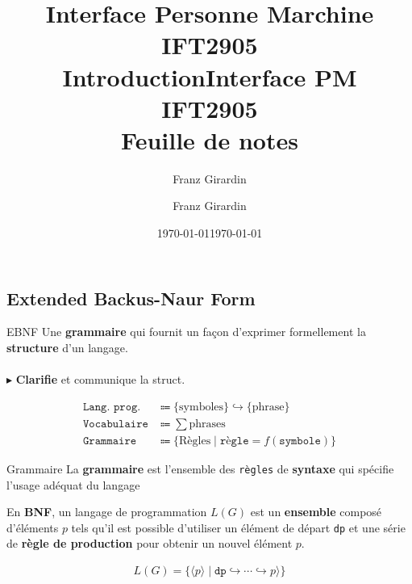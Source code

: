 \documentclass{report}
\title{\Huge{Interface Personne Marchine}\\{IFT2905}\\{\textbf{Introduction}}}
\author{\huge{Franz Girardin}}
\date{\today}
\title{\Huge{Interface PM}\\{IFT2905}\\{\textbf{Feuille de notes}}}
\author{\huge{Franz Girardin}}
\date{\today}
\begin{document}
\maketitle
\pagebreak
\tableofcontents
\pagebreak


\begin{multicols*}{3}


    \footnotesize

    \chapter{Extended Backus-Naur Form}

\begin{Definitionx}{EBNF}{}
  Une \textbf{grammaire} qui fournit un façon d'exprimer formellement 
  la \textbf{structure} d'un langage. 
  \mbox{}
  \\ \\ 
  $\blacktriangleright$  \textbf{ Clarifie} et communique la struct. 
\end{Definitionx}


\begin{align*}
  \texttt{Lang. prog. } & \Coloneqq \bigl\{\text{symboles} \bigr\}   
  \hookrightarrow \bigl\{ \text{phrase} \bigr\} 
  \\
  \texttt{Vocabulaire} & \Coloneqq \sum \text{phrases}
  \\
  \texttt{Grammaire} & \Coloneqq \bigl\{ \text{Règles} \; \big| \;
              \texttt{règle} = f(\texttt{symbole})  \bigr\}
\end{align*}      

\begin{Definitionx}{Grammaire}{}
    La \textbf{grammaire} est l'ensemble des \texttt{règles} 
    de \textbf{syntaxe} qui spécifie l'usage adéquat du langage   
\end{Definitionx}

En \textbf{BNF},   un langage de programmation $L(G)$ est un 
\textbf{ensemble} composé d'éléments $p$ tels 
qu'il est possible d'utiliser un élément de départ 
\texttt{dp} et une série de \textbf{règle de production} 
pour obtenir un nouvel élément $p$. 

\begin{align*}
    L(G) = \bigl\{ \langle p \rangle \; | \; \texttt{dp}    
              \hookrightarrow \cdots \hookrightarrow p
    \rangle  \bigr\}
\end{align*}


\end{multicols*}
\end{document}
